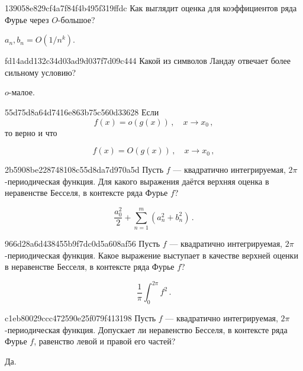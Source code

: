 \begin{note}{139058e829cf4a7f84f4b495f319ffdc}
    Как выглядит оценка для коэффициентов ряда Фурье через \({ O }\)-большое?

    \begin{cloze}{1}
        \({ a_n, b_n = O(1/n^{k}) }\).
    \end{cloze}
\end{note}

\begin{note}{fd14add132c34d03ad9d037f7d09c444}
    Какой из символов Ландау отвечает более сильному условию?

    \begin{cloze}{1}
        \({ o }\)-малое.
    \end{cloze}
\end{note}

\begin{note}{55d75d8a64d7416e863b75c560d33628}
    Если
    \[
        f(x) = o(g(x))\,, \quad x \to x_0\,,
    \]
    то верно и что
    \begin{icloze}{1}
        \[
            f(x) = O(g(x))\,, \quad x \to x_0\,,
        \]
    \end{icloze}
\end{note}

\begin{note}{2b5908be228748108c55d8da7d970a5d}
    Пусть \({ f }\) --- квадратично интегрируемая, \({ 2\pi }\)-периодическая функция.
    Для какого выражения даётся верхняя оценка в неравенстве Бесселя, в контексте ряда Фурье \({ f }\)?

    \begin{cloze}{1}
        \[
            \frac{a_0^2}{2} + \sum_{n=1}^{m}  (a_n^2 + b_n^2)\,.
        \]
    \end{cloze}
\end{note}

\begin{note}{966d28a6d438455b9f7dc0d5a608af56}
    Пусть \({ f }\) --- квадратично интегрируемая, \({ 2\pi }\)-периодическая функция.
    Какое выражение выступает в качестве верхней оценки в неравенстве Бесселя, в контексте ряда Фурье \({ f }\)?

    \begin{cloze}{1}
        \[
            \frac{1}{\pi} \int_{0}^{2\pi} f^2\,.
        \]
    \end{cloze}
\end{note}

\begin{note}{c1eb80029ccc472590e25f079f413198}
    Пусть \({ f }\) --- квадратично интегрируемая, \({ 2\pi }\)-периодическая функция.
    Допускает ли неравенство Бесселя, в контексте ряда Фурье \({ f }\), равенство левой и правой его частей?

    \begin{cloze}{1}
        Да.
    \end{cloze}
\end{note}

